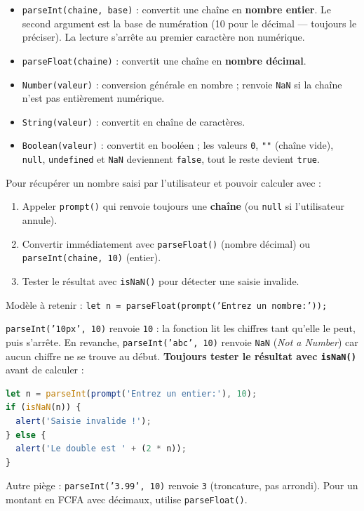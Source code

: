\documentclass[11pt]{article}
\begin{document}
\begin{propriete}
\begin{itemize}
  \item \texttt{parseInt(chaine, base)} : convertit une chaîne en \textbf{nombre entier}. Le second argument est la base de numération (10 pour le décimal — toujours le préciser). La lecture s'arrête au premier caractère non numérique.
  \item \texttt{parseFloat(chaine)} : convertit une chaîne en \textbf{nombre décimal}.
  \item \texttt{Number(valeur)} : conversion générale en nombre ; renvoie \texttt{NaN} si la chaîne n'est pas entièrement numérique.
  \item \texttt{String(valeur)} : convertit en chaîne de caractères.
  \item \texttt{Boolean(valeur)} : convertit en booléen ; les valeurs \texttt{0}, \texttt{""} (chaîne vide), \texttt{null}, \texttt{undefined} et \texttt{NaN} deviennent \texttt{false}, tout le reste devient \texttt{true}.
\end{itemize}
\end{propriete}

\begin{methode}
Pour récupérer un nombre saisi par l'utilisateur et pouvoir calculer avec :
\begin{enumerate}
  \item Appeler \texttt{prompt()} qui renvoie toujours une \textbf{chaîne} (ou \texttt{null} si l'utilisateur annule).
  \item Convertir immédiatement avec \texttt{parseFloat()} (nombre décimal) ou \texttt{parseInt(chaine, 10)} (entier).
  \item Tester le résultat avec \texttt{isNaN()} pour détecter une saisie invalide.
\end{enumerate}
Modèle à retenir : \texttt{let n = parseFloat(prompt('Entrez un nombre:'));}
\end{methode}

\begin{attention}
\texttt{parseInt('10px', 10)} renvoie \texttt{10} : la fonction lit les chiffres tant qu'elle le peut, puis s'arrête. En revanche, \texttt{parseInt('abc', 10)} renvoie \texttt{NaN} (\emph{Not a Number}) car aucun chiffre ne se trouve au début. \textbf{Toujours tester le résultat avec \texttt{isNaN()}} avant de calculer :
\begin{lstlisting}[language=JavaScript]
let n = parseInt(prompt('Entrez un entier:'), 10);
if (isNaN(n)) {
  alert('Saisie invalide !');
} else {
  alert('Le double est ' + (2 * n));
}
\end{lstlisting}
Autre piège : \texttt{parseInt('3.99', 10)} renvoie \texttt{3} (troncature, pas arrondi). Pour un montant en FCFA avec décimaux, utilise \texttt{parseFloat()}.
\end{attention}
\end{document}
